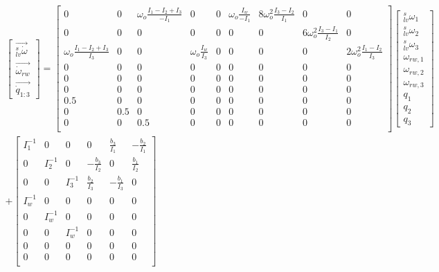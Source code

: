 \begin{align}
\begin{bmatrix}
\vec{_{lv}^s\dot{\omega}} \\
\vec{\dot{\omega}_{rw} } \\
\vec{\dot{q}_{1:3}}
\end{bmatrix}
 = 
\begin{bmatrix}
0 & 0 & \omega_o\frac{I_1 - I_2 + I_3}{-I_1} & 0 & 0 & \omega_o\frac{I_w}{-I_1} & 8\omega_o^2\frac{I_3 - I_2}{I_1} & 0 & 0 \\
0 & 0 &	0 & 0 & 0 &	0 & 0 &  6\omega_o^2\frac{I_3 - I_1}{I_2} & 0\\
 \omega_o\frac{I_1 - I_2 + I_3}{I_3}  & 0 & 0 &  \omega_o\frac{I_w}{I_3} & 0 &	0 & 0 & 0 & 2\omega_o^2\frac{I_1 - I_2}{I_3}\\
0 & 0 &	0  & 0 & 0 & 0 & 0 & 0 & 0\\
0 & 0 &	0  & 0 & 0 & 0 & 0 & 0 & 0 \\
0 & 0 &	0 & 0 & 0 & 0 & 0 & 0 & 0\\
0.5 & 0 &	0 & 0 & 0 & 0 & 0 & 0 & 0 \\
0 & 0.5 &	0& 0 & 0 & 0 & 0 & 0 & 0 \\
0 & 0 &	0.5 & 0 & 0 & 0 & 0 & 0 & 0\\
\end{bmatrix}
\begin{bmatrix}
_{lv}^s\omega_1 \\
_{lv}^s\omega_2 \\
_{lv}^s\omega_3 \\
\omega_{rw,1} \\
\omega_{rw,2} \\
\omega_{rw,3} \\
q_1 \\
q_2 \\
q_3 
\end{bmatrix}
 \\
+
\begin{bmatrix}
I_1^{-1} & 0 & 0 & 0 & \frac{b_3}{I_1} & -\frac{b_2}{I_1}\\
0 & I_2^{-1} & 0 & - \frac{b_3}{I_2} & 0 &  \frac{b_1}{I_2} \\ 
0 & 0 & I_3^{-1} &  \frac{b_2}{I_3} &  -\frac{b_1}{I_3} & 0 \\  
I_w^{-1} & 0 & 0 & 0 & 0 & 0 \\
0 & I_w^{-1} & 0 & 0 & 0 & 0 \\ 
0 & 0 & I_w^{-1} & 0 & 0 & 0 \\  
0 & 0 & 0 & 0 & 0 & 0 \\
0 & 0 & 0 & 0 & 0 & 0 \\

\end{bmatrix}
\end{align}
